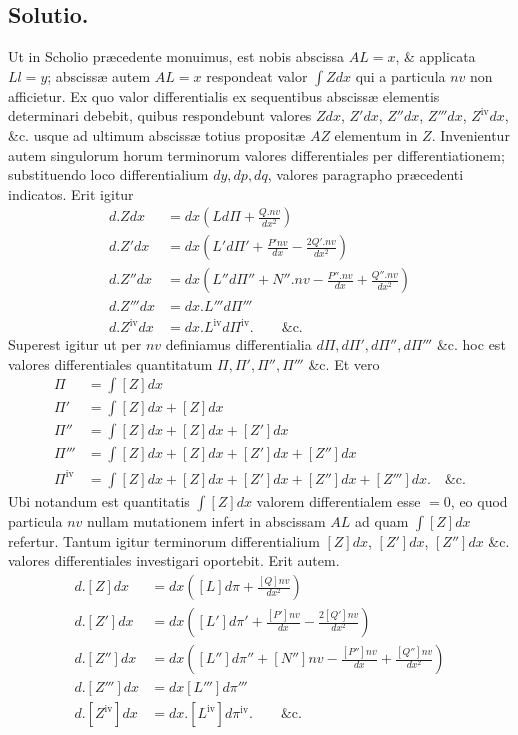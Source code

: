 \subsection*{Solutio.}
Ut in Scholio præcedente monuimus, est nobis abscissa $AL=x$, \& applicata $Ll=y$; abscissæ autem $AL=x$ respondeat valor $\int Zdx$ qui a particula $nv$ non afficietur. Ex quo valor differentialis ex sequentibus abscissæ elementis determinari debebit, quibus respondebunt valores $Zdx$, $Z'dx$, $Z''dx$, $Z'''dx$, $Z^{\mathrm{iv}}dx$, \&c. usque ad ultimum abscissæ totius propositæ $AZ$ elementum in $Z$. Invenientur autem singulorum horum terminorum valores differentiales per differentiationem; substituendo loco differentialium $dy,dp,dq$, valores paragrapho præcedenti indicatos. Erit igitur
\[
\begin{aligned}
d.Zdx&=dx\left(Ld\Pi+\frac{Q.nv}{dx^2}\right)\\
d.Z'dx&=dx\left(L'd\Pi'+\frac{P'nv}{dx}-\frac{2Q'.nv}{dx^2}\right)\\
d.Z''dx&=dx\left(L''d\Pi''+N''.nv-\frac{P''.nv}{dx}+\frac{Q''.nv}{dx^2}\right)\\
d.Z'''dx&=dx.L'''d\Pi'''\\
d.Z^{\mathrm{iv}}dx&=dx.L^{\mathrm{iv}}d\Pi^{\mathrm{iv}}.\qquad\text{\&c.}
\end{aligned}
\]
Superest igitur ut per $nv$ definiamus differentialia $d\Pi,d\Pi',d\Pi'',d\Pi'''$ \&c. hoc est valores differentiales quantitatum $\Pi,\Pi',\Pi'',\Pi'''$ \&c. Et vero
\[
\begin{aligned}
\Pi&=\int[Z]dx\\
\Pi'&=\int[Z]dx+[Z]dx\\
\Pi''&=\int[Z]dx+[Z]dx+[Z']dx\\
\Pi'''&=\int[Z]dx+[Z]dx+[Z']dx+[Z'']dx\\
\Pi^{\mathrm{iv}}&=\int[Z]dx+[Z]dx+[Z']dx+[Z'']dx+[Z''']dx.\quad\text{\&c.}
\end{aligned}
\]
Ubi notandum est quantitatis $\int[Z]dx$ valorem differentialem esse $=0$, eo quod particula $nv$ nullam mutationem infert in abscissam $AL$ ad quam $\int[Z]dx$ refertur. Tantum igitur terminorum differentialium $[Z]dx$, $[Z']dx$, $[Z'']dx$ \&c. valores differentiales investigari oportebit. Erit autem.
\[
\begin{aligned}
d.[Z]dx&=dx\left([L]d\pi+\frac{[Q]nv}{dx^2}\right)\\
d.[Z']dx&=dx\left([L']d\pi'+\frac{[P']nv}{dx}-\frac{2[Q']nv}{dx^2}\right)\\
d.[Z'']dx&=dx\left([L'']d\pi''+[N'']nv-\frac{[P'']nv}{dx}+\frac{[Q'']nv}{dx^2}\right)\\
d.[Z''']dx&=dx[L''']d\pi'''\\
d.[Z^{\mathrm{iv}}]dx&=dx.[L^{\mathrm{iv}}]d\pi^{\mathrm{iv}}.\qquad\text{\&c.}
\end{aligned}
\]
